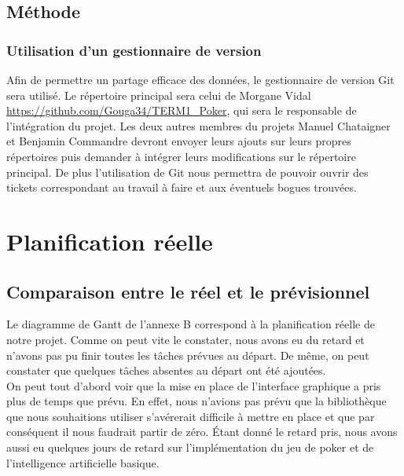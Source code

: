 \documentclass{report}
\begin{document}
\section{Méthode}
\subsection{Utilisation d'un gestionnaire de version}
\hspace{0.5cm}Afin de permettre un partage efficace des données, le gestionnaire de version Git sera utilisé. Le répertoire principal sera celui de Morgane Vidal \url{https://github.com/Gouga34/TERM1_Poker}, qui sera le responsable de l'intégration du projet. Les deux autres membres du projets Manuel Chataigner et Benjamin Commandre devront envoyer leurs ajouts sur leurs propres répertoires puis demander à intégrer leurs modifications sur le répertoire principal. De plus l'utilisation de Git nous permettra de pouvoir ouvrir des tickets correspondant au travail à faire et aux éventuels bogues trouvées.\par

\chapter{Planification réelle}
\section{Comparaison entre le réel et le prévisionnel}
\hspace{0.5cm}Le diagramme de Gantt de l'annexe B correspond à la planification réelle de notre projet. Comme on peut vite le constater, nous avons eu du retard et n'avons pas pu finir toutes les tâches prévues au départ. De même, on peut constater que quelques tâches absentes au départ ont été ajoutées.\\

On peut tout d'abord voir que la mise en place de l'interface graphique a pris plus de temps que prévu. En effet, nous n'avions pas prévu que la bibliothèque que nous souhaitions utiliser s’avérerait difficile à mettre en place et que par conséquent il nous faudrait partir de zéro. Étant donné le retard pris, nous avons aussi eu quelques jours de retard sur l'implémentation du jeu de poker et de l'intelligence artificielle basique. \\
\end{document}
